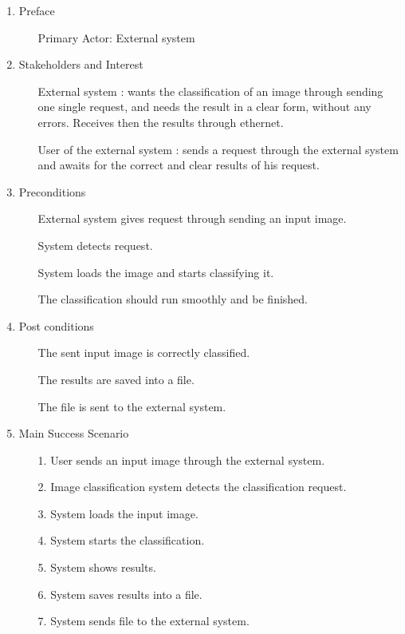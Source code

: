 \documentclass[parskip=full]{scrartcl}
\begin{document}
\begin{enumerate}
	\item Preface
	\begin{itemize} [nosep]
		\item[] Primary Actor: External system
	\end{itemize}
	\item Stakeholders and Interest
	\begin{itemize} [nosep]
		\item[] External system : wants the classification of an image through sending one single request, and needs the result in a clear form, without any errors. Receives then the results through ethernet. 
		\item[] User of the external system : sends a request through the external system and awaits for the correct and clear results of his request.
	\end{itemize}
	\item Preconditions
	\begin{itemize} [nosep]
		\item[] External system gives request through sending an input image.
		\item[] System detects request.
		\item[] System loads the image and starts classifying it.
		\item[] The classification should run smoothly and be finished.
	\end{itemize}
	\item Post conditions
	\begin{itemize} [nosep]
		\item[] The sent input image is correctly classified. 
		\item[] The results are saved into a file. 
		\item[] The file is sent to the external system.
	\end{itemize}
	\item Main Success Scenario
	\begin{itemize} [nosep]
		\item[1.] User sends an input image through the external system.
		\item[2.] Image classification system detects the classification request.
		\item[3.] System loads the input image.
		\item[4.] System starts the classification.
		\item[5.] System shows results.
		\item[6.] System saves results into a file.
		\item[7.] System sends file to the external system.
	\end{itemize}


\end{enumerate}
\end{document}
